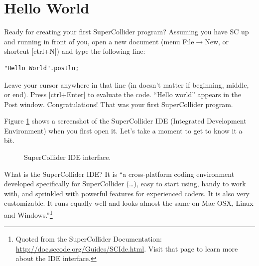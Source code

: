 \section{Hello World}

Ready for creating your first SuperCollider program? Assuming you have SC up and running in front of you, open a new document (menu File$\rightarrow$New, or shortcut [ctrl+N]) and type the following line:

 
\begin{lstlisting}[style=SuperCollider-IDE, basicstyle=\scttfamily\footnotesize ]
"Hello World".postln;
\end{lstlisting}
 

Leave your cursor anywhere in that line (in doesn't matter if beginning, middle, or end). Press [ctrl+Enter] to evaluate the code. ``Hello world'' appears in the Post window. Congratulations! That was your first SuperCollider program.

 
\bigskip
{}
\bigskip
 

Figure \ref{fig:scidegui} shows a screenshot of the SuperCollider IDE (Integrated Development Environment) when you first open it. Let's take a moment to get to know it a bit.

\begin{figure}[t]
\centerline{}
\caption{SuperCollider IDE interface.}
\label{fig:scidegui}
\end{figure}

What is the SuperCollider IDE? It is ``a cross-platform coding environment developed specifically for SuperCollider (\dots), easy to start using, handy to work with, and sprinkled with powerful features for experienced coders. It is also very customizable. It runs equally well and looks almost the same on Mac OSX, Linux and Windows.''\footnote{Quoted from the SuperCollider Documentation: \url{http://doc.sccode.org/Guides/SCIde.html}. Visit that page to learn more about the IDE interface.}

